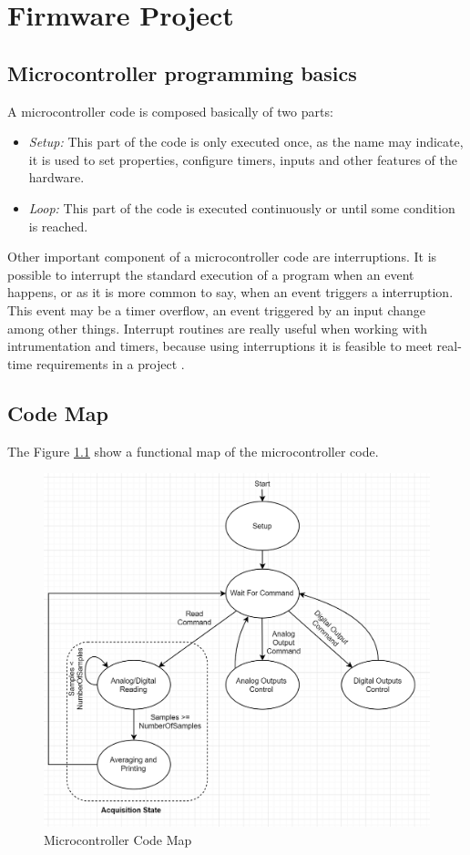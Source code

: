 \chapter{Firmware Project}\label{ch:software-project}

	\section{Microcontroller programming basics}\label{ssec:microcontroller-programming-basics}
		A microcontroller code is composed basically of two parts:
		
		\begin{itemize}
			\item \textit{Setup: } This part of the code is only executed once, as the name may indicate, it is used to set properties, configure timers, inputs and other features of the hardware.
			\item \textit{Loop: } This part of the code is executed continuously or until some condition is reached. 
		\end{itemize}
		
		\par
		
		Other important component of a microcontroller code are interruptions. It is possible to interrupt the standard execution of a program when an event happens, or as it is more common to say, when an event triggers a interruption. This event may be a timer overflow, an event triggered by an input change among other things. Interrupt routines are really useful when working with intrumentation and timers, because using interruptions it is feasible to meet real-time requirements in a project \cite{mukaro1999microcontroller}.
		
	\section{Code Map}\label{sec:microcontroller-code-map}
	
	The Figure \ref{fig:microCode} show a functional map of the microcontroller code.
	
	\begin{figure}[htbp]
		\centering
		\includegraphics[width=.8\textwidth]{figuras/fig-microCodeMap}
		\caption{Microcontroller Code Map}
		\label{fig:microCode}
	\end{figure}
	
